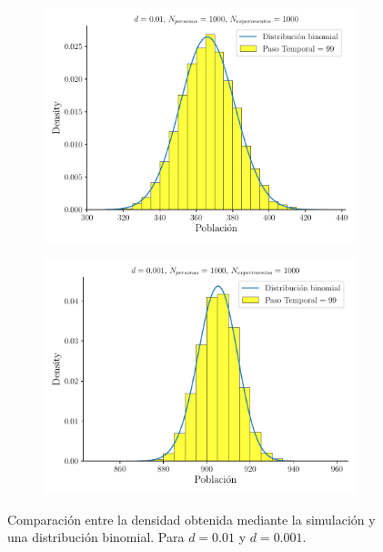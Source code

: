 \documentclass[twocolumn,aps,prl]{revtex4-1}
\begin{document}
\begin{figure}[ht!]
  \centering
  \begin{subfigure}[b]{0.49\linewidth}
      \centering
      \includegraphics[width = 0.999\textwidth]{figuras/ex01-a-ultima_iteracion.pdf}
      \label{fig:figuras/ex01-a-ultima_iteracion}
  \end{subfigure}
  \begin{subfigure}[b]{0.49\linewidth}
      \centering
      \includegraphics[width = 0.999\textwidth]{figuras/ex01-b-ultima_iteracion.pdf}
      \label{fig:figuras/ex01-b-ultima_iteracion}
  \end{subfigure}
  \caption{Comparación entre la densidad obtenida mediante la   simulación y una distribución binomial. Para $d=0.01$ y $d=0.001$.}
  \label{fig:figuras/ex01-ultima_iteracion}
\end{figure}
\end{document}
